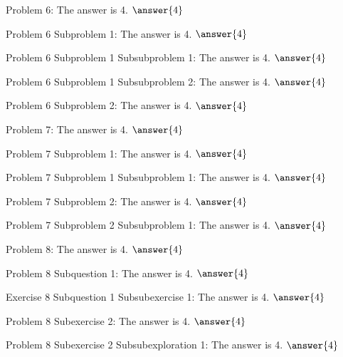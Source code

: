 \documentclass{ximera}
\begin{document}
\begin{problem}
    Problem 6: The answer is 4. $\answer{4}$
    \begin{problem}
        Problem 6 Subproblem 1: The answer is 4. $\answer{4}$
        \begin{problem}
            Problem 6 Subproblem 1 Subsubproblem 1: The answer is 4. $\answer{4}$
        \end{problem} 
        \begin{problem}
            Problem 6 Subproblem 1 Subsubproblem 2: The answer is 4. $\answer{4}$
        \end{problem} 
    \end{problem} 
    \begin{problem}
        Problem 6 Subproblem 2: The answer is 4. $\answer{4}$
    \end{problem} 
\end{problem} 

\begin{problem}
    Problem 7: The answer is 4. $\answer{4}$
    \begin{problem}
        Problem 7 Subproblem 1: The answer is 4. $\answer{4}$
        \begin{problem}
            Problem 7 Subproblem 1 Subsubproblem 1: The answer is 4. $\answer{4}$
        \end{problem} 
    \end{problem}
    \begin{problem}
        Problem 7 Subproblem 2: The answer is 4. $\answer{4}$
        \begin{problem}
            Problem 7 Subproblem 2 Subsubproblem 1: The answer is 4. $\answer{4}$
        \end{problem} 
    \end{problem} 
\end{problem} 

\begin{problem}
    Problem 8: The answer is 4. $\answer{4}$
    \begin{question}
        Problem 8 Subquestion 1: The answer is 4. $\answer{4}$
        \begin{exercise}
            Exercise 8 Subquestion 1 Subsubexercise 1: The answer is 4. $\answer{4}$
        \end{exercise}
    \end{question}
    \begin{exercise}
        Problem 8 Subexercise 2: The answer is 4. $\answer{4}$
        \begin{exploration}
            Problem 8 Subexercise 2 Subsubexploration 1: The answer is 4. $\answer{4}$
        \end{exploration}
    \end{exercise}
\end{problem}


\hrulefill
\end{document}
